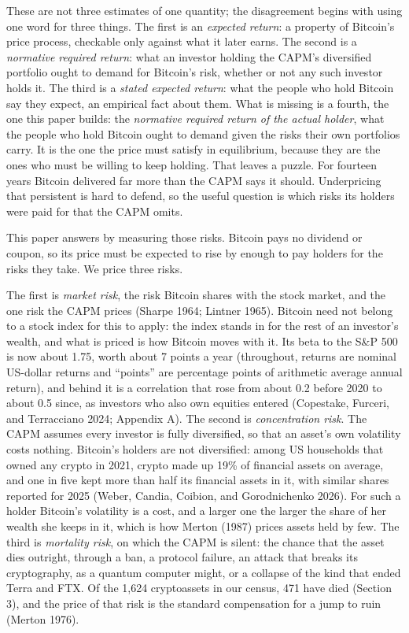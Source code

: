 \documentclass[11pt]{article}
\begin{document}
These are not three estimates of one quantity; the disagreement begins with using one word for three things. The first is an \emph{expected return}: a property of Bitcoin's price process, checkable only against what it later earns. The second is a \emph{normative required return}: what an investor holding the CAPM's diversified portfolio ought to demand for Bitcoin's risk, whether or not any such investor holds it. The third is a \emph{stated expected return}: what the people who hold Bitcoin say they expect, an empirical fact about them. What is missing is a fourth, the one this paper builds: the \emph{normative required return of the actual holder}, what the people who hold Bitcoin ought to demand given the risks their own portfolios carry. It is the one the price must satisfy in equilibrium, because they are the ones who must be willing to keep holding. That leaves a puzzle. For fourteen years Bitcoin delivered far more than the CAPM says it should. Underpricing that persistent is hard to defend, so the useful question is which risks its holders were paid for that the CAPM omits.

This paper answers by measuring those risks. Bitcoin pays no dividend or coupon, so its price must be expected to rise by enough to pay holders for the risks they take. We price three risks.

The first is \emph{market risk}, the risk Bitcoin shares with the stock market, and the one risk the CAPM prices (Sharpe 1964; Lintner 1965). Bitcoin need not belong to a stock index for this to apply: the index stands in for the rest of an investor's wealth, and what is priced is how Bitcoin moves with it. Its beta to the S\&P 500 is now about 1.75, worth about 7 points a year (throughout, returns are nominal US-dollar returns and ``points'' are percentage points of arithmetic average annual return), and behind it is a correlation that rose from about 0.2 before 2020 to about 0.5 since, as investors who also own equities entered (Copestake, Furceri, and Terracciano 2024; Appendix A). The second is \emph{concentration risk}. The CAPM assumes every investor is fully diversified, so that an asset's own volatility costs nothing. Bitcoin's holders are not diversified: among US households that owned any crypto in 2021, crypto made up 19\% of financial assets on average, and one in five kept more than half its financial assets in it, with similar shares reported for 2025 (Weber, Candia, Coibion, and Gorodnichenko 2026). For such a holder Bitcoin's volatility is a cost, and a larger one the larger the share of her wealth she keeps in it, which is how Merton (1987) prices assets held by few. The third is \emph{mortality risk}, on which the CAPM is silent: the chance that the asset dies outright, through a ban, a protocol failure, an attack that breaks its cryptography, as a quantum computer might, or a collapse of the kind that ended Terra and FTX. Of the 1,624 cryptoassets in our census, 471 have died (Section 3), and the price of that risk is the standard compensation for a jump to ruin (Merton 1976).
\end{document}
